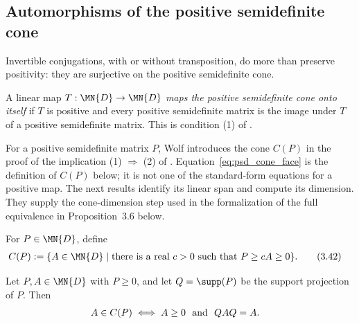 \subsection{Automorphisms of the positive semidefinite cone}

Invertible conjugations, with or without transposition, do more than preserve
positivity: they are surjective on the positive semidefinite cone.

\begin{definition}
    \label{def:maps_psd_cone_onto}
    \leanok
    A linear map $T:\MN{D}\to\MN{D}$ \emph{maps the positive semidefinite cone
        onto itself} if $T$ is positive and every positive semidefinite matrix is
    the image under $T$ of a positive semidefinite matrix. This is condition
    (1) of \cite[Proposition~3.6]{Wolf2012Quantum}.
\end{definition}

For a positive semidefinite matrix $P$, Wolf introduces the cone $C(P)$ in the
proof of the implication (1) $\Rightarrow$ (2) of
\cite[Proposition~3.6]{Wolf2012Quantum}. Equation~\eqref{eq:psd_cone_face}
is the definition of $C(P)$ below; it is not one of the standard-form equations
for a positive map.
The next results identify its linear span and compute its dimension. They
supply the cone-dimension step used in the formalization of the full
equivalence in Proposition~3.6 below.

\begin{definition}
    \label{def:psd_cone_face}
    \leanok
    For $P\in\MN{D}$, define
    \begin{align}
        C(P)
         & :=\{A\in\MN{D}\mid \text{there is a real }c>0
             \text{ such that }P\ge cA\ge0\}.
        \tag{3.42}\label{eq:psd_cone_face}
    \end{align}
\end{definition}

\begin{lemma}
    \label{lem:psd_cone_face_mem_iff}
    \leanok
    Let $P,A\in\MN{D}$ with $P\ge0$, and let $Q=\supp(P)$ be the support
    projection of $P$. Then
    \begin{align}
        A\in C(P)
         & \iff A\ge0\ \text{ and }\ QAQ=A.
        \notag
    \end{align}
\end{lemma}

